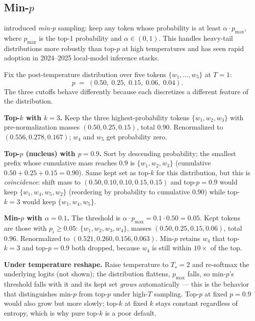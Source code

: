 \subsection{\texorpdfstring{Min-$p$}{Min-p}}

\citet{nguyen2024minp} introduced \emph{min-$p$} sampling: keep any
token whose probability is at least $\alpha \cdot p_{\max}$, where
$p_{\max}$ is the top-1 probability and $\alpha \in (0, 1)$. This
handles heavy-tail distributions more robustly than top-$p$ at high
temperatures and has seen rapid adoption in 2024--2025 local-model
inference stacks.

\begin{workedexample}
Fix the post-temperature distribution over five tokens
$\{w_1, \ldots, w_5\}$ at $T = 1$:
\[
p \;=\; (0.50,\; 0.25,\; 0.15,\; 0.06,\; 0.04).
\]
The three cutoffs behave differently because each discretizes a
different feature of the distribution.

\textbf{Top-$k$ with $k = 3$.} Keep the three highest-probability
tokens $\{w_1, w_2, w_3\}$ with pre-normalization masses
$(0.50, 0.25, 0.15)$, total $0.90$. Renormalized to
$(0.556, 0.278, 0.167)$; $w_4$ and $w_5$ get probability zero.

\textbf{Top-$p$ (nucleus) with $p = 0.9$.}
Sort by descending probability; the smallest prefix whose cumulative
mass reaches $0.9$ is $\{w_1, w_2, w_3\}$ (cumulative
$0.50 + 0.25 + 0.15 = 0.90$). Same kept set as top-$k$ for this
distribution, but this is \emph{coincidence}: shift mass to
$(0.50, 0.10, 0.10, 0.15, 0.15)$ and top-$p = 0.9$ would keep
$\{w_1, w_4, w_5, w_2\}$ (reordering by probability to cumulative
$0.90$) while top-$k = 3$ would keep $\{w_1, w_4, w_5\}$.

\textbf{Min-$p$ with $\alpha = 0.1$.} The threshold is
$\alpha \cdot p_{\max} = 0.1 \cdot 0.50 = 0.05$. Kept tokens are
those with $p_i \ge 0.05$: $\{w_1, w_2, w_3, w_4\}$, masses
$(0.50, 0.25, 0.15, 0.06)$, total $0.96$. Renormalized to
$(0.521, 0.260, 0.156, 0.063)$. Min-$p$ retains $w_4$ that top-$k=3$
and top-$p=0.9$ both dropped, because $w_4$ is still within $10\times$
of the top.

\textbf{Under temperature reshape.} Raise temperature to $T_s = 2$
and re-softmax the underlying logits (not shown); the distribution
flattens, $p_{\max}$ falls, so min-$p$'s threshold falls with it and
its kept set \emph{grows} automatically — this is the behavior that
distinguishes min-$p$ from top-$p$ under high-$T$ sampling. Top-$p$
at fixed $p = 0.9$ would also grow but more slowly; top-$k$ at fixed
$k$ stays constant regardless of entropy, which is why pure top-$k$
is a poor default.
\end{workedexample}

